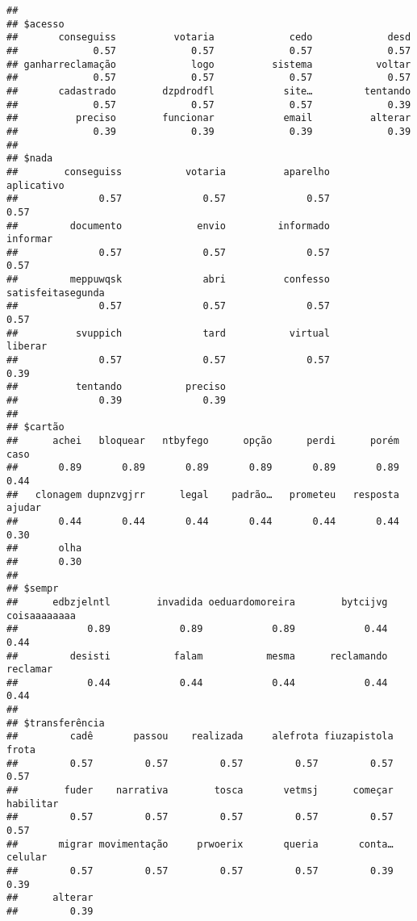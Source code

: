 \documentclass[
]{article}
\begin{document}
\begin{verbatim}
## 
## $acesso
##       conseguiss          votaria             cedo             desd 
##             0.57             0.57             0.57             0.57 
## ganharreclamação             logo          sistema           voltar 
##             0.57             0.57             0.57             0.57 
##       cadastrado        dzpdrodfl            site…         tentando 
##             0.57             0.57             0.57             0.39 
##          preciso        funcionar            email          alterar 
##             0.39             0.39             0.39             0.39 
## 
## $nada
##        conseguiss           votaria          aparelho        aplicativo 
##              0.57              0.57              0.57              0.57 
##         documento             envio         informado          informar 
##              0.57              0.57              0.57              0.57 
##         meppuwqsk              abri          confesso satisfeitasegunda 
##              0.57              0.57              0.57              0.57 
##          svuppich              tard           virtual           liberar 
##              0.57              0.57              0.57              0.39 
##          tentando           preciso 
##              0.39              0.39 
## 
## $cartão
##      achei   bloquear   ntbyfego      opção      perdi      porém       caso 
##       0.89       0.89       0.89       0.89       0.89       0.89       0.44 
##   clonagem dupnzvgjrr      legal    padrão…   prometeu   resposta     ajudar 
##       0.44       0.44       0.44       0.44       0.44       0.44       0.30 
##       olha 
##       0.30 
## 
## $sempr
##      edbzjelntl        invadida oeduardomoreira        bytcijvg    coisaaaaaaaa 
##            0.89            0.89            0.89            0.44            0.44 
##         desisti           falam           mesma      reclamando        reclamar 
##            0.44            0.44            0.44            0.44            0.44 
## 
## $transferência
##         cadê       passou    realizada     alefrota fiuzapistola        frota 
##         0.57         0.57         0.57         0.57         0.57         0.57 
##        fuder    narrativa        tosca       vetmsj      começar    habilitar 
##         0.57         0.57         0.57         0.57         0.57         0.57 
##       migrar movimentação     prwoerix       queria       conta…      celular 
##         0.57         0.57         0.57         0.57         0.39         0.39 
##      alterar 
##         0.39
\end{verbatim}
\end{document}
